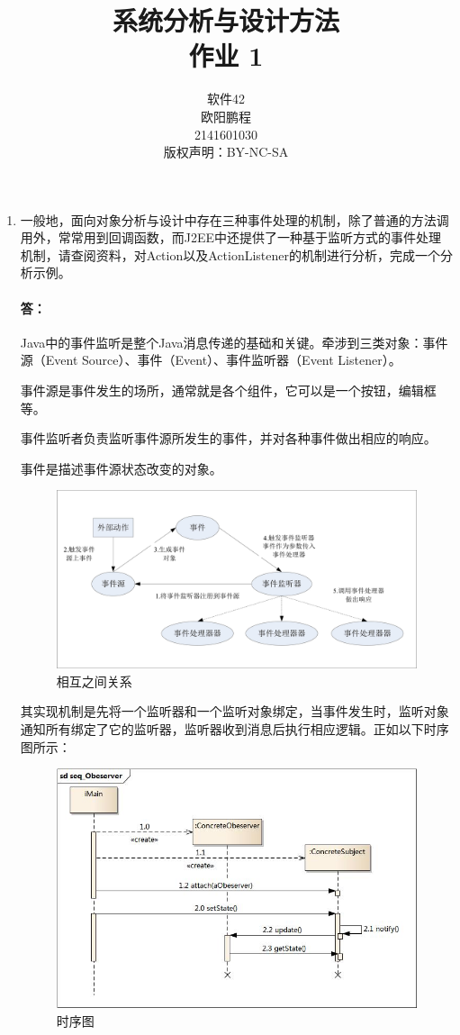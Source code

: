 \documentclass[UTF8]{ctexart}
\title{系统分析与设计方法 \\ 作业 1}
\author{软件42 \\ 欧阳鹏程 \\ 2141601030 \\ 版权声明：BY-NC-SA}
\begin{document}
\maketitle

\begin{enumerate}
	\item{一般地，面向对象分析与设计中存在三种事件处理的机制，除了普通的方法调用外，常常用到回调函数，而J2EE中还提供了一种基于监听方式的事件处理机制，请查阅资料，对Action以及ActionListener的机制进行分析，完成一个分析示例。}
	
	\paragraph{答：}
	Java中的事件监听是整个Java消息传递的基础和关键。牵涉到三类对象：事件源（Event Source）、事件（Event）、事件监听器（Event Listener）。 
	
	事件源是事件发生的场所，通常就是各个组件，它可以是一个按钮，编辑框等。 
	
	事件监听者负责监听事件源所发生的事件，并对各种事件做出相应的响应。 
	
	事件是描述事件源状态改变的对象。 
	
	\begin{figure}[H]
		\centering
		\includegraphics[width=\textwidth]{1.jpg}
		\caption{相互之间关系}
	\end{figure}

	其实现机制是先将一个监听器和一个监听对象绑定，当事件发生时，监听对象通知所有绑定了它的监听器，监听器收到消息后执行相应逻辑。正如以下时序图所示：
	
	\begin{figure}[H]
		\centering
		\includegraphics[width=\textwidth]{2.jpg}
		\caption{时序图}
	\end{figure}
\end{enumerate}
\end{document}
